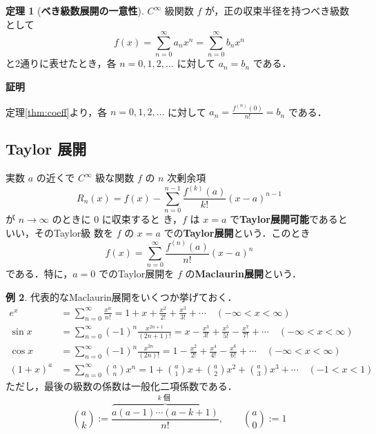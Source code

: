 \documentclass[10pt, uplatex, dvipdfmx]{jsarticle}
\makeatletter
\renewenvironment{proof}[1][\proofname]{\par
  \pushQED{\qed}%
  \normalfont \topsep6\p@\@plus6\p@\relax
  \trivlist
  \item\relax
  {\bfseries
  #1\@addpunct{.}}\hspace\labelsep\ignorespaces
}{%
  \popQED\endtrivlist\@endpefalse
}
\theoremstyle{definition}
\newtheorem{theorem}{定理}[section]
\newtheorem{example}[theorem]{例}
\renewcommand{\proofname}{\textbf{証明}}
\numberwithin{equation}{section}
\newcommand{\ds}{\displaystyle}
\makeatother
\begin{document}
\begin{theorem}[\textbf{べき級数展開の一意性}]\label{thm:unique-seriese}
  $C^{\infty}$ 級関数 $f$ が，正の収束半径を持つべき級数として
  \[
    f(x) = \sum_{n=0}^{\infty} a_n x^n = \sum_{n=0}^{\infty}b_n x^n
  \]
  と2通りに表せたとき，各 $n=0,1,2,\ldots$ に対して $a_n=b_n$ である．
\end{theorem}

\begin{proof}
  定理\ref{thm:coeff}より，各 $n=0,1,2,\ldots$ に対して
  $\ds a_n = \frac{f^{(n)}(0)}{n!} =b_n$ である．
\end{proof}

\subsection{Taylor 展開}

実数 $a$ の近くで $C^{\infty}$ 級な関数 $f$ の $n$ 次剰余項
\[
  R_n(x) = f(x) -\sum_{n=0}^{n-1}\frac{f^{(k)}(a)}{k!}(x-a)^{n-1}
\]
が $n \to \infty$ のときに $0$ に収束すると
き，$f$ は $x=a$ で\textbf{Taylor展開可能}であるといい，そのTaylor級
数を $f$ の $x=a$ での\textbf{Taylor展開}という．このとき
\[
  f(x) = \sum_{n=0}^{\infty} \frac{f^{(n)}(a)}{n!}(x-a)^n
\]
である．特に，$a=0$ でのTaylor展開を $f$ の\textbf{Maclaurin展開}という．

\begin{example}\label{exmp:taylor-serieses}
  代表的なMaclaurin展開をいくつか挙げておく．
  \[
    \begin{aligned}
      e^x &= \sum_{n=0}^{\infty} \frac{x^n}{n!} = 1 + x +
            \frac{x^2}{2!} + \frac{x^3}{3!} + \cdots \quad (-\infty < x <
            \infty)\\
      \sin x & = \sum_{n=0}^{\infty} (-1)^n \frac{x^{2n+1}}{(2n+1)!}
               = x - \frac{x^3}{3!} + \frac{x^5}{5!} -\frac{x^7}{7!} + \cdots \quad (-\infty < x < \infty)\\
      \cos x &= \sum_{n=0}^{\infty} (-1)^n \frac{x^{2n}}{(2n)!}
               = 1 - \frac{x^2}{2!} + \frac{x^4}{4!}-\frac{x^6}{6!}+\cdots \quad (-\infty < x < \infty)\\
      (1+x)^{a} &= \sum_{n=0}^{\infty} \binom{a}{n}x^n = 1 + \binom{a}{1}x + \binom{a}{2}x^2
                  + \binom{a}{3}x^3 + \cdots \quad (-1 < x < 1)
        \end{aligned}
      \]
      ただし，最後の級数の係数は一般化二項係数である．
      \[
        \binom{a}{k} := \frac{\overbrace{a(a-1)\cdots(a-k+1)}^{k \text{ 個 }}}{n!}, \qquad \binom{a}{0}:=1
      \]
    \end{example}
\end{document}
